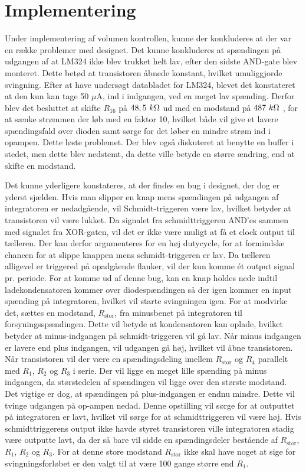 \section{Implementering}
Under implementering af volumen kontrollen, kunne der konkluderes at der var en række problemer med designet. Det kunne konkluderes at spændingen på udgangen af at LM324 ikke blev trukket helt lav, efter den sidste AND-gate blev monteret. Dette betød at transistoren åbnede konstant, hvilket umuliggjorde svingning. Efter at have undersøgt databladet for LM324, blevet det konstateret at den kun kan tage 50 $\mu$A, ind i indgangen, ved en meget lav spænding. Derfor blev det besluttet at skifte $R_{16}$ på $48,5~k\ohm$ ud med en modstand på $487~k\ohm$ , for at sænke strømmen der løb med en faktor 10, hvilket både vil give et lavere spændingsfald over dioden samt sørge for det løber en mindre strøm ind i opampen. Dette løste problemet. Der blev også diskuteret at benytte en buffer i stedet, men dette blev nedstemt, da dette ville betyde en større ændring, end at skifte en modstand.

Det kunne yderligere konstateres, at der findes en bug i designet, der dog er yderst sjælden. Hvis man slipper en knap mens spændingen på udgangen af integratoren er nedadgående, vil Schmidt-triggeren være lav, hvilket betyder at transistoren vil være lukket. Da signalet fra schmidttriggeren AND'es sammen med signalet fra XOR-gaten, vil det er ikke være muligt at få et clock output til tælleren. Der kan derfor argumenteres for en høj dutycycle, for at formindske chancen for at slippe knappen mens schmidt-triggeren er lav. Da tælleren alligevel er triggered på opadgående flanker, vil der kun komme ét output signal pr. periode. For at komme ud af denne bug, kan en knap holdes nede indtil ladekondensatoren kommer over diodespændingen så der igen kommer en input spænding på integratoren, hvilket vil starte svingningen igen. 
For at modvirke det, sættes en modstand, $R_{\mathrm{stor}}$, fra minusbenet på integratoren til forsyningsspændingen. Dette vil betyde at kondensatoren kan oplade, hvilket betyder at minus-indgangen på schmidt-triggeren vil gå lav. Når minus indgangen er lavere end plus indgangen, vil udgangen gå høj, hvilket vil åbne transistoren. Når transistoren vil der være en spændingsdeling imellem $R_{\mathrm{stor}}$ og $R_4$ parallelt med $R_1$, $R_2$ og $R_3$ i serie. Der vil ligge en meget lille spænding på minus indgangen, da størstedelen af spændingen vil ligge over den største modstand. Det vigtige er dog, at spændingen på plus-indgangen er endnu mindre. Dette vil tvinge udgangen på op-ampen nedad. Denne opstilling vil sørge for at outputtet på integratoren er lavt, hvilket vil sørge for at schmidttriggeren vil være høj. Hvis schmidttriggerens output ikke havde styret transistoren ville integratoren stadig være outputte lavt, da der så bare vil sidde en spændingsdeler bestående af $R_{\mathrm{stor}}$, $R_1$, $R_2$ og $R_3$.
For at denne store modstand $R_{\mathrm{stor}}$ ikke skal have noget at sige for svingningsforløbet er den valgt til at være 100 gange større end $R_1$. 